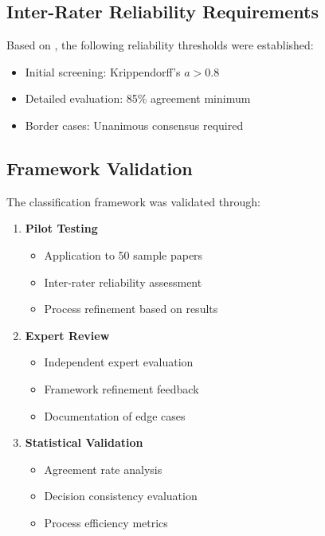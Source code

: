 \documentclass[acmsmall]{acmart}
\begin{document}
\subsection{Inter-Rater Reliability Requirements}\label{subsec:inter-rater-reliability-requirements}
Based on \citet{krippendorff2004reliability}, the following reliability thresholds were established:

\begin{itemize}
    \item Initial screening: Krippendorff's $a > 0.8$
    \item Detailed evaluation: 85\% agreement minimum
    \item Border cases: Unanimous consensus required
\end{itemize}

\subsection{Framework Validation}\label{subsec:framework-validation}
The classification framework was validated through:

\begin{enumerate}
    \item \textbf{Pilot Testing}
          \begin{itemize}
              \item Application to 50 sample papers
              \item Inter-rater reliability assessment
              \item Process refinement based on results
          \end{itemize}

    \item \textbf{Expert Review}
          \begin{itemize}
              \item Independent expert evaluation
              \item Framework refinement feedback
              \item Documentation of edge cases
          \end{itemize}

    \item \textbf{Statistical Validation}
          \begin{itemize}
              \item Agreement rate analysis
              \item Decision consistency evaluation
              \item Process efficiency metrics
          \end{itemize}
\end{enumerate}
\end{document}
